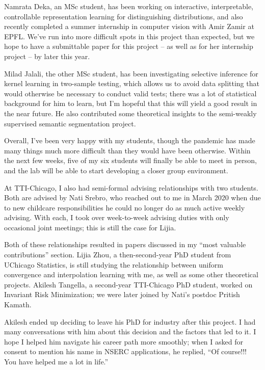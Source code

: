 \documentclass[12pt]{article}
\begin{document}
{{{{Namrata Deka, an MSc student, has been working on interactive, interpretable, controllable representation learning for distinguishing distributions, and also recently completed a summer internship in computer vision with Amir Zamir at EPFL. We've run into more difficult spots in this project than expected, but we hope to have a submittable paper for this project -- as well as for her internship project -- by later this year.

Milad Jalali, the other MSc student, has been investigating selective inference for kernel learning in two-sample testing, which allows us to avoid data splitting that would otherwise be necessary to conduct valid tests; there was a lot of statistical background for him to learn, but I'm hopeful that this will yield a good result in the near future. He also contributed some theoretical insights to the semi-weakly supervised semantic segmentation project.

Overall, I've been very happy with my students, though the pandemic has made many things much more difficult than they would have been otherwise. Within the next few weeks, five of my six students will finally be able to meet in person, and the lab will be able to start developing a closer group environment.

At TTI-Chicago, I also had semi-formal advising relationships with two students. Both are advised by Nati Srebro, who reached out to me in March 2020 when due to new childcare responsibilities he could no longer do as much active weekly advising. With each, I took over week-to-week advising duties with only occasional joint meetings; this is still the case for Lijia.

Both of these relationships resulted in papers discussed in my ``most valuable contributions'' section.
Lijia Zhou, a then-second-year PhD student from UChicago Statistics, is still studying the relationship between uniform convergence and interpolation learning with me, as well as some other theoretical projects. Akilesh Tangella, a second-year TTI-Chicago PhD student, worked on Invariant Risk Minimization; we were later joined by Nati's postdoc Pritish Kamath.

Akilesh ended up deciding to leave his PhD for industry after this project. I had many conversations with him about this decision and the factors that led to it. I hope I helped him navigate his career path more smoothly; when I asked for consent to mention his name in NSERC applications, he replied, ``Of course!!! You have helped me a lot in life.''

}}}}
\end{document}
